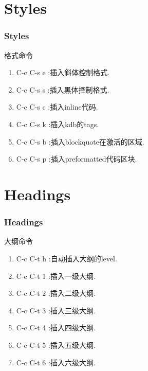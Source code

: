 \documentclass[11pt]{beamer}
\begin{document}
\section{Styles}
\begin{frame}
  \frametitle{Styles}
  \begin{block}{格式命令}
    \begin{enumerate}
    \item C-c C-s e :{插入斜体控制格式.}
    \item C-c C-s s :{插入黑体控制格式.}
    \item C-c C-s c :{插入inline代码.}
    \item C-c C-s k :{插入kdb的tags.}
    \item C-c C-s b :{插入blockquote在激活的区域.}
    \item C-c C-s p :{插入preformatted代码区块.}
    \end{enumerate}
  \end{block}
\end{frame}

\section{Headings}
\begin{frame}
  \frametitle{Headings}
  \begin{block}{大纲命令}
    \begin{enumerate}
    \item C-c C-t h :{自动插入大纲的level.}
    \item C-c C-t 1 :{插入一级大纲.}
    \item C-c C-t 2 :{插入二级大纲.}
    \item C-c C-t 3 :{插入三级大纲.}
    \item C-c C-t 4 :{插入四级大纲.}
    \item C-c C-t 5 :{插入五级大纲.}
    \item C-c C-t 6 :{插入六级大纲.}
    \end{enumerate}
  \end{block}
\end{frame}
\end{document}
